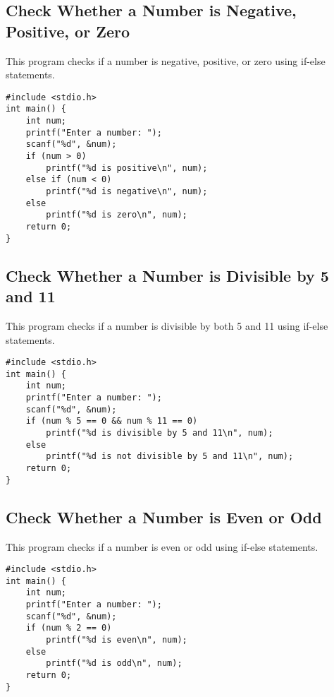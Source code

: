 \documentclass[a4paper,12pt]{article}
\begin{document}
\newpage

\subsection{Check Whether a Number is Negative, Positive, or Zero}
This program checks if a number is negative, positive, or zero using if-else statements.

\begin{lstlisting}[caption={Check Whether a Number is Negative, Positive, or Zero}]
#include <stdio.h>
int main() {
    int num;
    printf("Enter a number: ");
    scanf("%d", &num);
    if (num > 0)
        printf("%d is positive\n", num);
    else if (num < 0)
        printf("%d is negative\n", num);
    else
        printf("%d is zero\n", num);
    return 0;
}
\end{lstlisting}

\newpage

\subsection{Check Whether a Number is Divisible by 5 and 11}
This program checks if a number is divisible by both 5 and 11 using if-else statements.

\begin{lstlisting}[caption={Check Whether a Number is Divisible by 5 and 11}]
#include <stdio.h>
int main() {
    int num;
    printf("Enter a number: ");
    scanf("%d", &num);
    if (num % 5 == 0 && num % 11 == 0)
        printf("%d is divisible by 5 and 11\n", num);
    else
        printf("%d is not divisible by 5 and 11\n", num);
    return 0;
}
\end{lstlisting}

\newpage

\subsection{Check Whether a Number is Even or Odd}
This program checks if a number is even or odd using if-else statements.

\begin{lstlisting}[caption={Check Whether a Number is Even or Odd}]
#include <stdio.h>
int main() {
    int num;
    printf("Enter a number: ");
    scanf("%d", &num);
    if (num % 2 == 0)
        printf("%d is even\n", num);
    else
        printf("%d is odd\n", num);
    return 0;
}
\end{lstlisting}
\end{document}
